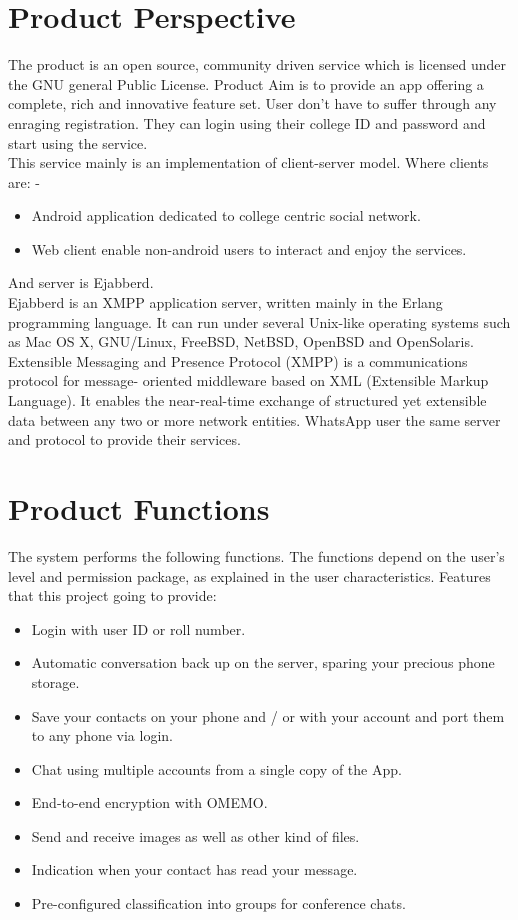 \section{Product Perspective}
The product is an open source, community driven service which is licensed under the GNU general Public
License. Product Aim is to provide an app offering a complete, rich and innovative feature set. User don't
have to suffer through any enraging registration. They can login using their college ID and password and
start using the service.\\
\noindent This service mainly is an implementation of client-server model. Where clients are: -
\begin{itemize}
\item Android application dedicated to college centric social network.
\item Web client enable non-android users to interact and enjoy the services.
\end{itemize}
\noindent And server is Ejabberd.\\
\noindent Ejabberd is an XMPP application server, written mainly in the Erlang programming language. It can run
under several Unix-like operating systems such as Mac OS X, GNU/Linux, FreeBSD, NetBSD, OpenBSD
and OpenSolaris.\\
\noindent Extensible Messaging and Presence Protocol (XMPP) is a communications protocol for message- oriented
middleware based on XML (Extensible Markup Language). It enables the near-real-time exchange of
structured yet extensible data between any two or more network entities. WhatsApp user the same server
and protocol to provide their services.
\section{Product Functions}
The system performs the following functions. The functions depend on the user’s level and permission
package, as explained in the user characteristics. Features that this project going to provide:
\begin{itemize}
\item Login with user ID or roll number.
\item Automatic conversation back up on the server, sparing your precious phone storage.
\item Save your contacts on your phone and / or with your account and port them to any phone via login.
\item Chat using multiple accounts from a single copy of the App.
\item End-to-end encryption with OMEMO.
\item Send and receive images as well as other kind of files.
\item Indication when your contact has read your message.
\item Pre-configured classification into groups for conference chats.
\end{itemize}
